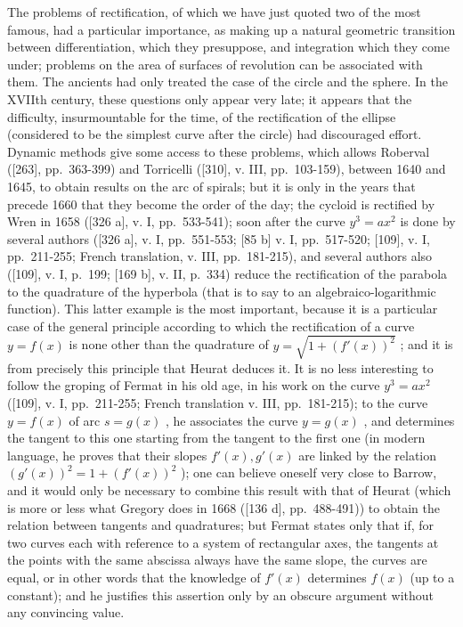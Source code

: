 The problems of rectification, of which we have just quoted two of the most famous, had a particular importance, as making up a natural geometric transition between differentiation, which they presuppose, and integration which they come under; problems on the area of surfaces of revolution can be associated with them. The ancients had only treated the case of the circle and the sphere. In the XVIIth century, these questions only appear very late; it appears that the difficulty, insurmountable for the time, of the rectification of the ellipse (considered to be the simplest curve after the circle) had discouraged effort. Dynamic methods give some access to these problems, which allows Roberval ({[}263{]}, pp.~363-399) and Torricelli ({[}310{]}, v. III, pp.~103-159), between 1640 and 1645, to obtain results on the arc of spirals; but it is only in the years that precede 1660 that they become the order of the day; the cycloid is rectified by Wren in 1658 ({[}326 a{]}, v. I, pp.~533-541); soon after the curve \(y^3 = ax^2\) is done by several authors ({[}326 a{]}, v. I, pp.~551-553; {[}85 b{]} v. I, pp.~517-520; {[}109{]}, v. I, pp.~211-255; French translation, v. III, pp.~181-215), and several authors also ({[}109{]}, v. I, p.~199; {[}169 b{]}, v. II, p.~334) reduce the rectification of the parabola to the quadrature of the hyperbola (that is to say to an algebraico-logarithmic function). This latter example is the most important, because it is a particular case of the general principle according to which the rectification of a curve \(y = f(x)\) is none other than the quadrature of \(y = \sqrt{1 + (f'(x))^2}\) ; and it is from precisely this principle that Heurat deduces it. It is no less interesting to follow the groping of Fermat in his old age, in his work on the curve \(y^3 = ax^2\) ({[}109{]}, v. I, pp.~211-255; French translation v. III, pp.~181-215); to the curve \(y = f(x)\) of arc \(s = g(x)\) , he associates the curve \(y = g(x)\) , and determines the tangent to this one starting from the tangent to the first one (in modern language, he proves that their slopes \(f'(x), g'(x)\) are linked by the relation \((g'(x))^2 = 1 + (f'(x))^2\) ); one can believe oneself very close to Barrow, and it would only be necessary to combine this result with that of Heurat (which is more or less what Gregory does in 1668 ({[}136 d{]}, pp.~488-491)) to obtain the relation between tangents and quadratures; but Fermat states only that if, for two curves each with reference to a system of rectangular axes, the tangents at the points with the same abscissa always have the same slope, the curves are equal, or in other words that the knowledge of \(f'(x)\) determines \(f(x)\) (up to a constant); and he justifies this assertion only by an obscure argument without any convincing value.

